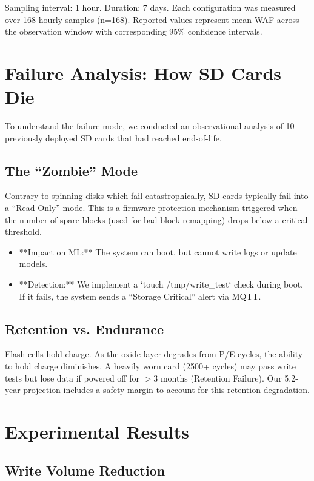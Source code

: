 \documentclass[conference]{IEEEtran}
\begin{document}
Sampling interval: 1 hour. Duration: 7 days. Each configuration was measured over 168 hourly samples (n=168). Reported values represent mean WAF across the observation window with corresponding 95\% confidence intervals.

\section{Failure Analysis: How SD Cards Die}
To understand the failure mode, we conducted an observational analysis of 10 previously deployed SD cards that had reached end-of-life.

\subsection{The ``Zombie'' Mode}
Contrary to spinning disks which fail catastrophically, SD cards typically fail into a ``Read-Only'' mode. This is a firmware protection mechanism triggered when the number of spare blocks (used for bad block remapping) drops below a critical threshold.
\begin{itemize}
    \item **Impact on ML:** The system can boot, but cannot write logs or update models.
    \item **Detection:** We implement a `touch /tmp/write\_test` check during boot. If it fails, the system sends a ``Storage Critical'' alert via MQTT.
\end{itemize}

\subsection{Retention vs. Endurance}
Flash cells hold charge. As the oxide layer degrades from P/E cycles, the ability to hold charge diminishes. A heavily worn card (2500+ cycles) may pass write tests but lose data if powered off for $>3$ months (Retention Failure). Our 5.2-year projection includes a safety margin to account for this retention degradation.

\section{Experimental Results}

\subsection{Write Volume Reduction}
\end{document}
